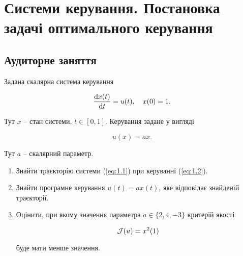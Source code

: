 \section{Системи керування. Постановка задачі оптимального керування}

\subsection*{Аудиторне заняття}

\begin{problem}
	Задана скалярна система керування 
	
	\begin{equation}
		\label{eq:1.1}
		\frac{\mathop{}\!\mathrm{d} x(t)}{\mathop{}\!\mathrm{d} t} = u(t), \quad x(0) = 1.
	\end{equation}

	Тут $x$ -- стан системи, $t \in [0, 1]$. Керування задане у вигляді

	\begin{equation}
		\label{eq:1.2}
		u(x) = a x.
	\end{equation}

	Тут $a$ -- скалярний параметр.

	\begin{enumerate}
		\item Знайти траєкторію системи (\ref{eq:1.1}) при керуванні (\ref{eq:1.2}).

		\item Знайти програмне керування $u(t) = a x (t)$, яке відповідає знайденій траєкторії. 

		\item Оцінити, при якому значення параметра $a \in \{2, 4, -3\}$ критерій якості 

		\[ \mathcal{J}(u) = x^2 (1) \]

		буде мати менше значення.
	\end{enumerate}
\end{problem}

